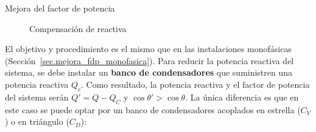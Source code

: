 \documentclass[11pt]{book} %
\makeatletter
\numberwithin{dummy}{section}
\theoremstyle{ocrenumbox}
\theoremstyle{blacknumex}
\theoremstyle{blacknumbox}
\theoremstyle{ocrenum}
\renewcommand{\section}{\@startsection{section}{1}{\z@}
{-4ex \@plus -1ex \@minus -.4ex}
{1ex \@plus.2ex }
{\normalfont\large\sffamily\bfseries}}
\makeatother
\begin{document}
		\section{Mejora del factor de potencia}
		\begin{figure}
		    \centering
		    \hfill
		    \caption{Compensación de reactiva}
		\end{figure}
		El objetivo y procedimiento es el mismo que en las instalaciones monofásicas (Sección~\ref{sec.mejora_fdp_monofasica}). Para reducir la potencia reactiva del sistema, se debe instalar un \textbf{banco de condensadores} que suministren una potencia reactiva $Q_c$. Como resultado, la potencia reactiva y el factor de potencia del sistema serán $Q' = Q - Q_C$ y $\cos\theta' > \cos \theta$. La única diferencia es que en este caso se puede optar por un banco de condensadores acoplados en estrella ($C_Y$) o en triángulo ($C_D$):
\end{document}
